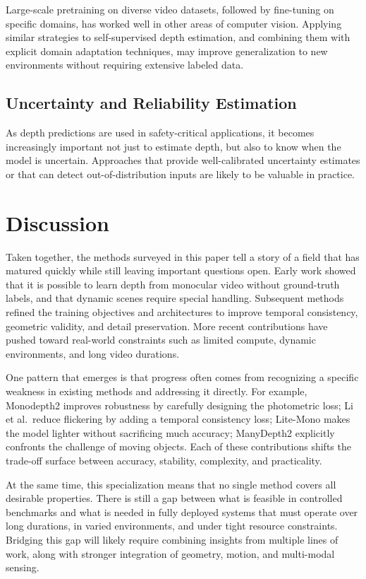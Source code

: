 \documentclass[10pt,twocolumn,letterpaper]{article}
\begin{document}
Large-scale pretraining on diverse video datasets, followed by fine-tuning on specific domains, has worked well in other areas of computer vision. Applying similar strategies to self-supervised depth estimation, and combining them with explicit domain adaptation techniques, may improve generalization to new environments without requiring extensive labeled data.

\subsection{Uncertainty and Reliability Estimation}

As depth predictions are used in safety-critical applications, it becomes increasingly important not just to estimate depth, but also to know when the model is uncertain. Approaches that provide well-calibrated uncertainty estimates or that can detect out-of-distribution inputs are likely to be valuable in practice.

\section{Discussion}
\label{sec:discussion}

Taken together, the methods surveyed in this paper tell a story of a field that has matured quickly while still leaving important questions open. Early work showed that it is possible to learn depth from monocular video without ground-truth labels, and that dynamic scenes require special handling. Subsequent methods refined the training objectives and architectures to improve temporal consistency, geometric validity, and detail preservation. More recent contributions have pushed toward real-world constraints such as limited compute, dynamic environments, and long video durations.

One pattern that emerges is that progress often comes from recognizing a specific weakness in existing methods and addressing it directly. For example, Monodepth2 improves robustness by carefully designing the photometric loss; Li et al.\ reduce flickering by adding a temporal consistency loss; Lite-Mono makes the model lighter without sacrificing much accuracy; ManyDepth2 explicitly confronts the challenge of moving objects. Each of these contributions shifts the trade-off surface between accuracy, stability, complexity, and practicality.

At the same time, this specialization means that no single method covers all desirable properties. There is still a gap between what is feasible in controlled benchmarks and what is needed in fully deployed systems that must operate over long durations, in varied environments, and under tight resource constraints. Bridging this gap will likely require combining insights from multiple lines of work, along with stronger integration of geometry, motion, and multi-modal sensing.
\end{document}
